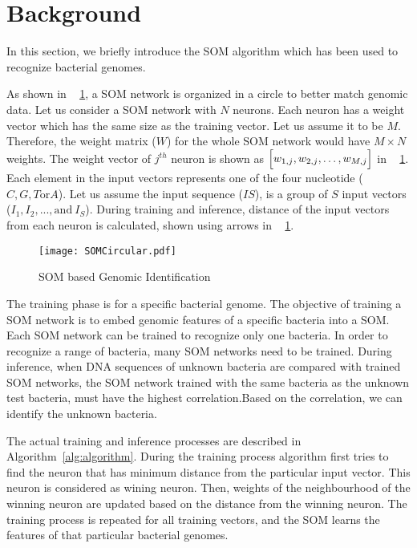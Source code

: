 \section{Background}
In this section, we briefly introduce the SOM algorithm \cite{Yang2018RiBoSOM} which has been used to recognize bacterial genomes.

As shown in \figurename{~ \ref{fig:algorithm}}, a SOM network is organized in a circle to better match genomic data. Let us consider a SOM network with $N$ neurons. Each neuron has a weight vector which has the same size as the training vector. Let us assume it to be $M$. Therefore, the weight matrix ($W$) for the whole SOM network would have $M{\times}N$ weights. The weight vector of $j^{th}$ neuron is shown as $\Bigl[ w_{1,j},w_{2,j},\ldots,w_{M,j}\Bigr]$ in \figurename{~ \ref{fig:algorithm}}. Each element in the input vectors represents one of the four nucleotide ($C,G,T \text{or} A$). Let us assume the input sequence ($IS$), is a group of $S$ input vectors ($I_1, I_2,...,\text{and}~I_S$). During training and inference, distance of the input vectors from each neuron is calculated, shown using arrows in \figurename{~ \ref{fig:algorithm}}.
\begin{figure}[htb]
	\centerline{\texttt{[image: SOMCircular.pdf]}}
	\caption{SOM based Genomic Identification}
	\label{fig:algorithm}
\end{figure}

The training phase is for a specific bacterial genome. The objective of training a SOM network is to embed genomic features of a specific bacteria into a SOM. Each SOM network can be trained to recognize only one bacteria. In order to recognize a range of bacteria, many SOM networks need to be trained. During inference, when DNA sequences of unknown bacteria are compared with trained SOM networks, the SOM network trained with the same bacteria as the unknown test bacteria, must have the highest correlation.Based on the correlation, we can identify the unknown bacteria. 

The actual training and inference processes are described in Algorithm~\ref{alg:algorithm}. During the training process algorithm first tries to find the neuron that has minimum distance from the particular input vector. This neuron is considered as wining neuron. Then, weights of the neighbourhood of the winning neuron are updated based on the distance from the winning neuron. The training process is repeated for all training vectors, and the SOM learns the features of that particular bacterial genomes.

